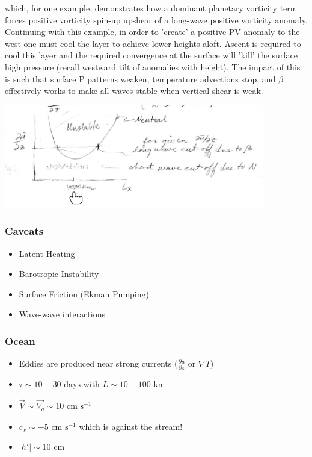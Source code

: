 \documentclass[a4paper,12pt]{article}
\begin{document}
which, for one example, demonstrates how a dominant planetary vorticity term forces positive vorticity spin-up upshear of a long-wave positive vorticity anomaly. Continuing with this example, in order to 'create' a positive PV anomaly to the west one must cool the layer to achieve lower heights aloft. Ascent is required to cool this layer and the required convergence at the surface will 'kill' the surface high pressure (recall westward tilt of anomalies with height). The impact of this is such that surface P patterns weaken, temperature advections stop, and $\beta$ effectively works to make all waves stable when vertical shear is weak.

\includegraphics[width= \textwidth]{bcli_4}

\subsubsection*{Caveats}
\begin{itemize}
	\item Latent Heating
	\item Barotropic Instability 
	\item Surface Friction (Ekman Pumping)
	\item Wave-wave interactions
\end{itemize}

\subsubsection*{Ocean}
\begin{itemize}
	\item Eddies are produced near strong currents ($\frac{\partial u}{\partial z}$ or $\nabla T$)
	\item $\tau \sim 10-30 \text{ days}$ with $L \sim 10-100 \text{ km}$
	\item $\vec{V} \sim \vec{V_g} \sim 10 \text{ cm s}^{-1}$
	\item $c_x \sim -5 \text{ cm s}^{-1}$ which is against the stream! 
	\item $|h'| \sim 10 \text{ cm}$
\end{itemize}
\end{document}
